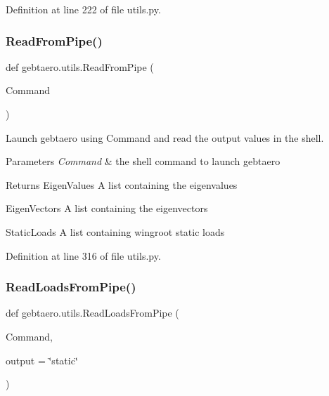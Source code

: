 Definition at line 222 of file utils.\+py.

\mbox{\label{namespacegebtaero_1_1utils_ad35c5461b34c42fdf3fb6abb8c21a46d}} 
\subsubsection{\texorpdfstring{Read\+From\+Pipe()}{ReadFromPipe()}}
{\footnotesize\ttfamily def gebtaero.\+utils.\+Read\+From\+Pipe (\begin{DoxyParamCaption}\item[{}]{Command }\end{DoxyParamCaption})}



Launch gebtaero using Command and read the output values in the shell. 


\begin{DoxyParams}{Parameters}
{\em Command} & the shell command to launch gebtaero \\
\hline
\end{DoxyParams}
\begin{DoxyReturn}{Returns}
Eigen\+Values A list containing the eigenvalues 

Eigen\+Vectors A list containing the eigenvectors 

Static\+Loads A list containing wingroot static loads 
\end{DoxyReturn}


Definition at line 316 of file utils.\+py.

\mbox{\label{namespacegebtaero_1_1utils_ad2812937cff40c12f0af963ab0b429b6}} 
\subsubsection{\texorpdfstring{Read\+Loads\+From\+Pipe()}{ReadLoadsFromPipe()}}
{\footnotesize\ttfamily def gebtaero.\+utils.\+Read\+Loads\+From\+Pipe (\begin{DoxyParamCaption}\item[{}]{Command,  }\item[{}]{output = {\ttfamily \char`\"{}static\char`\"{}} }\end{DoxyParamCaption})}



